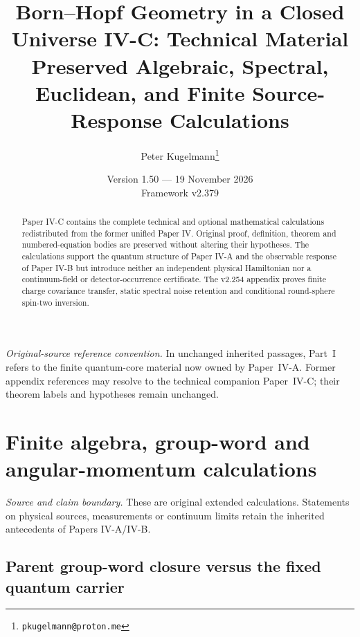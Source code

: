 \documentclass[12pt,a4paper]{article}
\title{\textbf{Born--Hopf Geometry in a Closed Universe IV-C: Technical Material} \\[0.5em]\large Preserved Algebraic, Spectral, Euclidean, and Finite Source-Response Calculations}
\author{Peter Kugelmann\thanks{\texttt{pkugelmann@proton.me}}}
\date{Version 1.50 --- 19 November 2026 \\ Framework v2.379}
\begin{document}
\maketitle
\begin{abstract}
Paper IV-C contains the complete technical and optional mathematical calculations redistributed from the former unified Paper IV. Original proof, definition, theorem and numbered-equation bodies are preserved without altering their hypotheses. The calculations support the quantum structure of Paper IV-A and the observable response of Paper IV-B but introduce neither an independent physical Hamiltonian nor a continuum-field or detector-occurrence certificate. The v2.254 appendix proves finite charge covariance transfer, static spectral noise retention and conditional round-sphere spin-two inversion.
\end{abstract}
\setcounter{tocdepth}{2}
\tableofcontents
\clearpage
\noindent\textit{Original-source reference convention.} In unchanged inherited passages, Part~I refers to the finite quantum-core material now owned by Paper~IV-A. Former appendix references may resolve to the technical companion Paper~IV-C; their theorem labels and hypotheses remain unchanged.

\section[Finite algebra, group-word and angular-momentum calculations]{Finite algebra, group-word and\\ angular-momentum calculations}
\label{p4c:sec:v238-c1}
\noindent\textit{Source and claim boundary.} These are original extended calculations. Statements on physical sources, measurements or continuum limits retain the inherited antecedents of Papers IV-A/IV-B.

\subsection{Parent group-word closure versus the fixed quantum carrier}
\label{p4:sec:v188-group-word-carrier-firewall}
\end{document}
